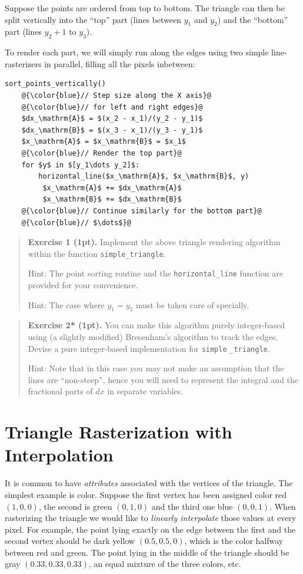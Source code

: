 \documentclass{article}
\newenvironment{exercise}[2]{\begin{verse}\textbf{Exercise #1 (#2pt).} }{
\end{verse}\medskip}
\begin{document}
Suppose the points are ordered from top to bottom. The triangle can then be split vertically into the ``top'' part (lines between $y_1$ and $y_2$) and the ``bottom'' part (lines $y_2+1$ to $y_3$).

To render each part, we will simply run along the edges using two simple line-rasterizers in parallel, filling all the pixels inbetween:

\begin{lstlisting}[escapechar=@]
   sort_points_vertically()
	@{\color{blue}// Step size along the X axis}@
	@{\color{blue}// for left and right edges}@
	$dx_\mathrm{A}$ = $(x_2 - x_1)/(y_2 - y_1)$
	$dx_\mathrm{B}$ = $(x_3 - x_1)/(y_3 - y_1)$
	$x_\mathrm{A}$ = $x_\mathrm{B}$ = $x_1$
	@{\color{blue}// Render the top part}@
	for $y$ in $[y_1\dots y_2]$:
		horizontal_line($x_\mathrm{A}$, $x_\mathrm{B}$, y)
		 $x_\mathrm{A}$ += $dx_\mathrm{A}$
		 $x_\mathrm{B}$ += $dx_\mathrm{B}$
	@{\color{blue}// Continue similarly for the bottom part}@
	@{\color{blue}// $\dots$}@
\end{lstlisting}

\begin{exercise}{1}{1}
Implement the above triangle rendering algorithm within the function \verb#simple_triangle#.

Hint: The point sorting routine and the \verb#horizontal_line# function are provided for your convenience.

Hint: The case where $y_1 = y_2$ must be taken care of specially.
\end{exercise}

\begin{exercise}{2*}{1}
You can make this algorithm purely integer-based using (a slightly modified) Bresenham's algorithm to track the edges. Devise a pure integer-based implementation for \texttt{simple} \verb#_triangle#. 

Hint: Note that in this case you may not make an assumption that the lines are ``non-steep'', hence you will need to represent the integral and the fractional parts of $dx$ in separate variables.
\end{exercise}

\section{Triangle Rasterization with Interpolation}
It is common to have \emph{attributes} associated with the vertices of the triangle. The simplest example is color. Suppose the first vertex has been assigned color red $(1,0,0)$, the second is green $(0,1,0)$ and the third one blue $(0,0,1)$. When rasterizing the triangle we would like to \emph{linearly interpolate} those values at every pixel. For example, the point lying exactly on the edge between the first and the second vertex should be dark yellow $(0.5, 0.5, 0)$, which is the color halfway between red and green. The point lying in the middle of the triangle should be gray $(0.33, 0.33, 0.33)$, an equal mixture of the three colors, etc.
\end{document}
